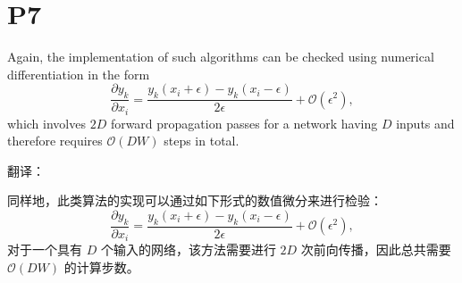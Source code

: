 \documentclass{article}
\begin{document}
\section{P7}

Again, the implementation of such algorithms can be checked using numerical differentiation in the form
\begin{equation}
    \frac{\partial y_k}{\partial x_i} = \frac{y_k(x_i + \epsilon) - y_k(x_i - \epsilon)}{2\epsilon} + \mathcal{O}(\epsilon^2),
    \tag{8.35}
\end{equation}
which involves $2D$ forward propagation passes for a network having $D$ inputs and therefore requires $\mathcal{O}(DW)$ steps in total.

{\color{red}
翻译：

同样地，此类算法的实现可以通过如下形式的数值微分来进行检验：
\begin{equation}
    \frac{\partial y_k}{\partial x_i} = \frac{y_k(x_i + \epsilon) - y_k(x_i - \epsilon)}{2\epsilon} + \mathcal{O}(\epsilon^2),
    \tag{8.35}
\end{equation}
对于一个具有 $D$ 个输入的网络，该方法需要进行 $2D$ 次前向传播，因此总共需要 $\mathcal{O}(DW)$ 的计算步数。
}
\end{document}
